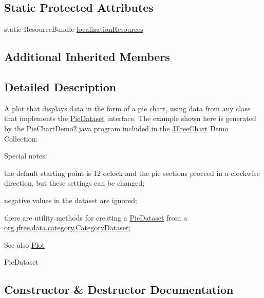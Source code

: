\subsection*{Static Protected Attributes}
\begin{DoxyCompactItemize}
\item 
static Resource\+Bundle \mbox{\hyperlink{classorg_1_1jfree_1_1chart_1_1plot_1_1_pie_plot_ae80d081fac8f984473df266e877aaf5c}{localization\+Resources}}
\end{DoxyCompactItemize}
\subsection*{Additional Inherited Members}


\subsection{Detailed Description}
A plot that displays data in the form of a pie chart, using data from any class that implements the \mbox{\hyperlink{}{Pie\+Dataset}} interface. The example shown here is generated by the {\ttfamily Pie\+Chart\+Demo2.\+java} program included in the \mbox{\hyperlink{classorg_1_1jfree_1_1chart_1_1_j_free_chart}{J\+Free\+Chart}} Demo Collection\+: ~\newline
~\newline
  

Special notes\+: 
\begin{DoxyEnumerate}
\item the default starting point is 12 o\textquotesingle{}clock and the pie sections proceed in a clockwise direction, but these settings can be changed; 
\item negative values in the dataset are ignored; 
\item there are utility methods for creating a \mbox{\hyperlink{}{Pie\+Dataset}} from a \mbox{\hyperlink{interfaceorg_1_1jfree_1_1data_1_1category_1_1_category_dataset}{org.\+jfree.\+data.\+category.\+Category\+Dataset}}; 
\end{DoxyEnumerate}

\begin{DoxySeeAlso}{See also}
\mbox{\hyperlink{classorg_1_1jfree_1_1chart_1_1plot_1_1_plot}{Plot}} 

Pie\+Dataset 
\end{DoxySeeAlso}


\subsection{Constructor \& Destructor Documentation}
\mbox{\label{classorg_1_1jfree_1_1chart_1_1plot_1_1_pie_plot_a9d245d7042da8b6b426e791bbf5bbaa1}} 
